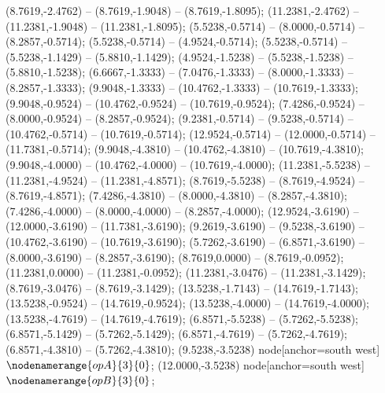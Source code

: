    (8.7619,-2.4762) -- (8.7619,-1.9048) -- (8.7619,-1.8095);
   (11.2381,-2.4762) -- (11.2381,-1.9048) -- (11.2381,-1.8095);
   (5.5238,-0.5714) -- (8.0000,-0.5714) -- (8.2857,-0.5714);
   (5.5238,-0.5714) -- (4.9524,-0.5714);
   (5.5238,-0.5714) -- (5.5238,-1.1429) -- (5.8810,-1.1429);
   (4.9524,-1.5238) -- (5.5238,-1.5238) -- (5.8810,-1.5238);
   (6.6667,-1.3333) -- (7.0476,-1.3333) -- (8.0000,-1.3333) -- (8.2857,-1.3333);
   (9.9048,-1.3333) -- (10.4762,-1.3333) -- (10.7619,-1.3333);
   (9.9048,-0.9524) -- (10.4762,-0.9524) -- (10.7619,-0.9524);
   (7.4286,-0.9524) -- (8.0000,-0.9524) -- (8.2857,-0.9524);
   (9.2381,-0.5714) -- (9.5238,-0.5714) -- (10.4762,-0.5714) -- (10.7619,-0.5714);
   (12.9524,-0.5714) -- (12.0000,-0.5714) -- (11.7381,-0.5714);
   (9.9048,-4.3810) -- (10.4762,-4.3810) -- (10.7619,-4.3810);
   (9.9048,-4.0000) -- (10.4762,-4.0000) -- (10.7619,-4.0000);
   (11.2381,-5.5238) -- (11.2381,-4.9524) -- (11.2381,-4.8571);
   (8.7619,-5.5238) -- (8.7619,-4.9524) -- (8.7619,-4.8571);
   (7.4286,-4.3810) -- (8.0000,-4.3810) -- (8.2857,-4.3810);
   (7.4286,-4.0000) -- (8.0000,-4.0000) -- (8.2857,-4.0000);
   (12.9524,-3.6190) -- (12.0000,-3.6190) -- (11.7381,-3.6190);
   (9.2619,-3.6190) -- (9.5238,-3.6190) -- (10.4762,-3.6190) -- (10.7619,-3.6190);
   (5.7262,-3.6190) -- (6.8571,-3.6190) -- (8.0000,-3.6190) -- (8.2857,-3.6190);
   (8.7619,0.0000) -- (8.7619,-0.0952);
   (11.2381,0.0000) -- (11.2381,-0.0952);
   (11.2381,-3.0476) -- (11.2381,-3.1429);
   (8.7619,-3.0476) -- (8.7619,-3.1429);
   (13.5238,-1.7143) -- (14.7619,-1.7143);
   (13.5238,-0.9524) -- (14.7619,-0.9524);
   (13.5238,-4.0000) -- (14.7619,-4.0000);
   (13.5238,-4.7619) -- (14.7619,-4.7619);
   (6.8571,-5.5238) -- (5.7262,-5.5238);
   (6.8571,-5.1429) -- (5.7262,-5.1429);
   (6.8571,-4.7619) -- (5.7262,-4.7619);
   (6.8571,-4.3810) -- (5.7262,-4.3810);
   (9.5238,-3.5238) node[anchor=south west] {$\nodenamerange{opA}{3}{0}$};
   (12.0000,-3.5238) node[anchor=south west] {$\nodenamerange{opB}{3}{0}$};
